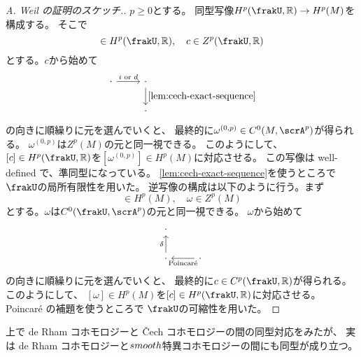\documentclass[report]{jlreq}
\begin{document}
\begin{proof}[A. Weil の証明のスケッチ.]
    $p \ge 0$とする。
    同型写像$H^p(\frakU, \R) \to H^p(M)$を構成する。
    そこで
    \begin{equation}
        [c] \in H^p(\frakU, \R),
        \quad
        c \in Z^p(\frakU, \R)
    \end{equation}
    とする。$c$から始めて
    \begin{equation}
        \begin{tikzcd}
            \cdot \ar{r}{i \text{ or } d} & \cdot \ar{d}{\cref{lem:cech-exact-sequence}} \\
            & \cdot
        \end{tikzcd}
    \end{equation}
    の向きに順繰りに元を選んでいくと、
    最終的に$\omega^{(0, p)} \in C^0(M, \scrA^p)$が得られる。
    $\omega^{(0, p)}$は$Z^p(M)$の元と同一視できる。
    このようにして、
    $[c] \in H^p(\frakU, \R)$を$[\omega^{(0, p)}] \in H^p(M)$に対応させる。
    この写像は well-defined で、準同型になっている。
    \cref{lem:cech-exact-sequence}を使うところで
    $\frakU$の局所有限性を用いた。
    逆写像の構成は以下のように行う。まず
    \begin{equation}
        [\omega] \in H^p(M),
        \quad
        \omega \in Z^p(M)
    \end{equation}
    とする。$\omega$は$C^0(\frakU, \scrA^p)$の元と同一視できる。
    $\omega$から始めて
    \begin{equation}
        \begin{tikzcd}
            \cdot \\
            \cdot \ar{u}{\delta} & \cdot \ar{l}{\text{Poincar\'{e}}}
        \end{tikzcd}
    \end{equation}
    の向きに順繰りに元を選んでいくと、
    最終的に$c \in C^p(\frakU, \R)$が得られる。
    このようにして、
    $[\omega] \in H^p(M)$を$[c] \in H^p(\frakU, \R)$に対応させる。
    Poincar\'{e} の補題を使うところで
    $\frakU$の可縮性を用いた。
\end{proof}

上で de Rham コホモロジーと \v{C}ech コホモロジーの間の同型対応をみたが、
実は de Rham コホモロジーと$\\smooth$特異コホモロジーの間にも同型が成り立つ。
\end{document}
